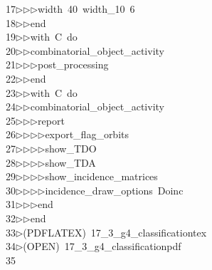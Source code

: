 \begin{tabbing}
17\>$\triangleright$\>$\triangleright$\>$\triangleright$\>width\ 40\ width\_10\ 6\ \\[0pt]
18\>$\triangleright$\>$\triangleright$\>end\ \\[0pt]
19\>$\triangleright$\>$\triangleright$\>with\ C\ do\ \\[0pt]
20\>$\triangleright$\>$\triangleright$\>combinatorial\_object\_activity\ \\[0pt]
21\>$\triangleright$\>$\triangleright$\>$\triangleright$\>post\_processing\ \\[0pt]
22\>$\triangleright$\>$\triangleright$\>end\ \\[0pt]
23\>$\triangleright$\>$\triangleright$\>with\ C\ do\ \\[0pt]
24\>$\triangleright$\>$\triangleright$\>combinatorial\_object\_activity\ \\[0pt]
25\>$\triangleright$\>$\triangleright$\>$\triangleright$\>report\ \\[0pt]
26\>$\triangleright$\>$\triangleright$\>$\triangleright$\>$\triangleright$\>export\_flag\_orbits\ \\[0pt]
27\>$\triangleright$\>$\triangleright$\>$\triangleright$\>$\triangleright$\>show\_TDO\ \\[0pt]
28\>$\triangleright$\>$\triangleright$\>$\triangleright$\>$\triangleright$\>show\_TDA\ \\[0pt]
29\>$\triangleright$\>$\triangleright$\>$\triangleright$\>$\triangleright$\>show\_incidence\_matrices\ \\[0pt]
30\>$\triangleright$\>$\triangleright$\>$\triangleright$\>$\triangleright$\>incidence\_draw\_options\ Doinc\ \\[0pt]
31\>$\triangleright$\>$\triangleright$\>$\triangleright$\>end\ \\[0pt]
32\>$\triangleright$\>$\triangleright$\>end\\[0pt]
33\>$\triangleright$\>(PDFLATEX)\ 17\_3\_g4\_classificationtex\\[0pt]
34\>$\triangleright$\>(OPEN)\ 17\_3\_g4\_classificationpdf\\[0pt]
35\>\end{tabbing}
